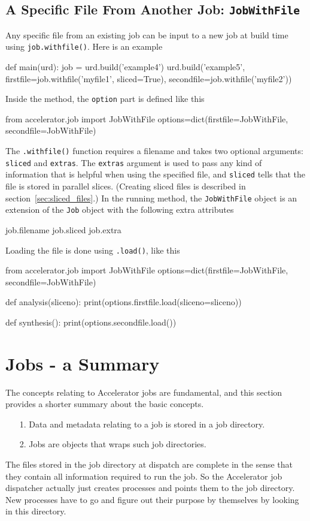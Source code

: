 \subsection{A Specific File From Another Job:  \texttt{JobWithFile}}
\label{sec:jobwithfile}
Any specific file from an existing job can be input to a new job at
build time using \texttt{job.withfile()}.  Here is an example
\begin{python}
def main(urd):
    job = urd.build('example4')
    urd.build('example5',
              firstfile=job.withfile('myfile1', sliced=True),
              secondfile=job.withfile('myfile2'))
\end{python}
Inside the method, the \texttt{option} part is defined like this
\begin{python}
from accelerator.job import JobWithFile
options=dict(firstfile=JobWithFile, secondfile=JobWithFile)
\end{python}
The \texttt{.withfile()} function requires a filename and takes two
optional arguments: \texttt{sliced} and \texttt{extras}.  The
\texttt{extras} argument is used to pass any kind of information that
is helpful when using the specified file, and \texttt{sliced} tells
that the file is stored in parallel slices.  (Creating sliced files is
described in section~\ref{sec:sliced_files}.)  In the
running method, the \texttt{JobWithFile} object is an extension of the
\texttt{Job} object with the following extra attributes
\begin{python}
job.filename
job.sliced
job.extra
\end{python}
Loading the file is done using \texttt{.load()}, like this
\begin{python}
from accelerator.job import JobWithFile
options=dict(firstfile=JobWithFile, secondfile=JobWithFile)

def analysis(sliceno):
    print(options.firstfile.load(sliceno=sliceno))

def synthesis():
    print(options.secondfile.load())
\end{python}



\section{Jobs - a Summary}
The concepts relating to Accelerator jobs are fundamental, and this
section provides a shorter summary about the basic concepts.

\begin{itemize}
\item[1.]  Data and metadata relating to a job is stored in a
job directory.
\item[2.]  Jobs are objects that wraps such job directories.
\end{itemize}
The files stored in the job directory at dispatch are complete in the
sense that they contain all information required to run the job.  So
the Accelerator job dispatcher actually just creates processes and
points them to the job directory.  New processes have to go and figure
out their purpose by themselves by looking in this directory.

